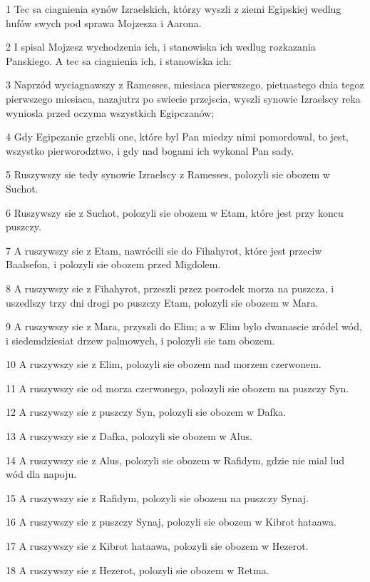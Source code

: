 \par 1 Tec sa ciagnienia synów Izraelskich, którzy wyszli z ziemi Egipskiej wedlug hufów swych pod sprawa Mojzesza i Aarona.
\par 2 I spisal Mojzesz wychodzenia ich, i stanowiska ich wedlug rozkazania Panskiego. A tec sa ciagnienia ich, i stanowiska ich:
\par 3 Naprzód wyciagnawszy z Ramesses, miesiaca pierwszego, pietnastego dnia tegoz pierwszego miesiaca, nazajutrz po swiecie przejscia, wyszli synowie Izraelscy reka wyniosla przed oczyma wszystkich Egipczanów;
\par 4 Gdy Egipczanie grzebli one, które byl Pan miedzy nimi pomordowal, to jest, wszystko pierworodztwo, i gdy nad bogami ich wykonal Pan sady.
\par 5 Ruszywszy sie tedy synowie Izraelscy z Ramesses, polozyli sie obozem w Suchot.
\par 6 Ruszywszy sie z Suchot, polozyli sie obozem w Etam, które jest przy koncu puszczy.
\par 7 A ruszywszy sie z Etam, nawrócili sie do Fihahyrot, które jest przeciw Baalsefon, i polozyli sie obozem przed Migdolem.
\par 8 A ruszywszy sie z Fihahyrot, przeszli przez posrodek morza na puszcza, i uszedlszy trzy dni drogi po puszczy Etam, polozyli sie obozem w Mara.
\par 9 A ruszywszy sie z Mara, przyszli do Elim; a w Elim bylo dwanascie zródel wód, i siedemdziesiat drzew palmowych, i polozyli sie tam obozem.
\par 10 A ruszywszy sie z Elim, polozyli sie obozem nad morzem czerwonem.
\par 11 A ruszywszy sie od morza czerwonego, polozyli sie obozem na puszczy Syn.
\par 12 A ruszywszy sie z puszczy Syn, polozyli sie obozem w Dafka.
\par 13 A ruszywszy sie z Dafka, polozyli sie obozem w Alus.
\par 14 A ruszywszy sie z Alus, polozyli sie obozem w Rafidym, gdzie nie mial lud wód dla napoju.
\par 15 A ruszywszy sie z Rafidym, polozyli sie obozem na puszczy Synaj.
\par 16 A ruszywszy sie z puszczy Synaj, polozyli sie obozem w Kibrot hataawa.
\par 17 A ruszywszy sie z Kibrot hataawa, polozyli sie obozem w Hezerot.
\par 18 A ruszywszy sie z Hezerot, polozyli sie obozem w Retma.
